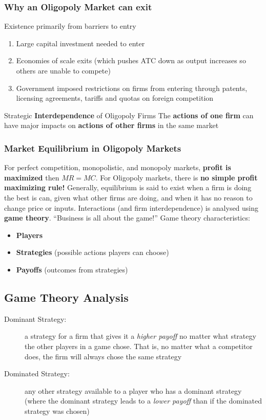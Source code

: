 \subsubsection{Why an Oligopoly Market can exit}
Existence primarily from barriers to entry
\begin{enumerate}
	\item Large capital investment needed to enter
	\item Economies of scale exits (which pushes ATC down as output increases so others are unable to compete)
	\item Government imposed restrictions on firms from entering through patents, licensing agreements, tariffs and quotas on foreign competition
\end{enumerate}
\begin{note}{Strategic \textbf{Interdependence} of Oligopoly Firms}
	The \textbf{actions of one firm} can have major impacts on \textbf{actions of other firms} in the same market
\end{note}
\subsubsection{Market Equilibrium in Oligopoly Markets}
For perfect competition, monopolistic, and monopoly markets, \textbf{profit is maximized} then $MR=MC$. For Oligopoly markets, there is \textbf{no simple profit maximizing rule!} Generally, equilibrium is said to exist when a firm is doing the best is can, given what other firms are doing, and when it has no reason to change price or inputs. Interactions (and firm interdependence) is analysed using \textbf{game theory}. ``Business is all about the game!'' Game theory characteristics:
\begin{itemize}
	\item \textbf{Players}
	\item \textbf{Strategies} (possible actions players can choose)
	\item \textbf{Payoffs} (outcomes from strategies)
\end{itemize}

\subsection{Game Theory Analysis}
\begin{description}
	\item[Dominant Strategy:] a strategy for a firm that gives it a \textit{higher payoff} no matter what strategy the other players in a game chose. That is, no matter what a competitor does, the firm will always chose the same strategy
	\item[Dominated Strategy:] any other strategy available to a player who has a dominant strategy (where the dominant strategy leads to a \textit{lower payoff} than if the dominated strategy was chosen)
\end{description}
